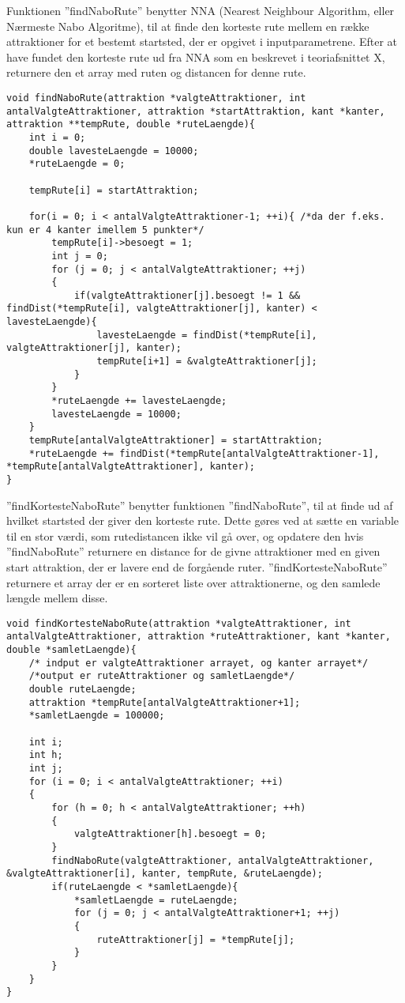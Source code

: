 Funktionen ”findNaboRute” benytter NNA (Nearest Neighbour Algorithm, eller Nærmeste Nabo Algoritme), til at finde den korteste rute mellem en række attraktioner for et bestemt startsted, der er opgivet i inputparametrene. Efter at have fundet den korteste rute ud fra NNA som en beskrevet i teoriafsnittet X, returnere den et array med ruten og distancen for denne rute. 

\begin{lstlisting}
void findNaboRute(attraktion *valgteAttraktioner, int antalValgteAttraktioner, attraktion *startAttraktion, kant *kanter, attraktion **tempRute, double *ruteLaengde){
	int i = 0;
	double lavesteLaengde = 10000;
	*ruteLaengde = 0;

	tempRute[i] = startAttraktion;

	for(i = 0; i < antalValgteAttraktioner-1; ++i){ /*da der f.eks. kun er 4 kanter imellem 5 punkter*/
		tempRute[i]->besoegt = 1;
		int j = 0;
		for (j = 0; j < antalValgteAttraktioner; ++j)
		{
			if(valgteAttraktioner[j].besoegt != 1 && findDist(*tempRute[i], valgteAttraktioner[j], kanter) < lavesteLaengde){
				lavesteLaengde = findDist(*tempRute[i], valgteAttraktioner[j], kanter);
				tempRute[i+1] = &valgteAttraktioner[j];
			}
		}
		*ruteLaengde += lavesteLaengde;
		lavesteLaengde = 10000;
	}
	tempRute[antalValgteAttraktioner] = startAttraktion;
	*ruteLaengde += findDist(*tempRute[antalValgteAttraktioner-1], *tempRute[antalValgteAttraktioner], kanter);
}
\end{lstlisting}

”findKortesteNaboRute” benytter funktionen ”findNaboRute”, til at finde ud af hvilket startsted der giver den korteste rute. Dette gøres ved at sætte en variable til en stor værdi, som rutedistancen ikke vil gå over, og opdatere den hvis ”findNaboRute” returnere en distance for de givne attraktioner med en given start attraktion, der er lavere end de forgående ruter. ”findKortesteNaboRute” returnere et array der er en sorteret liste over attraktionerne, og den samlede længde mellem disse. 

\begin{lstlisting}
void findKortesteNaboRute(attraktion *valgteAttraktioner, int antalValgteAttraktioner, attraktion *ruteAttraktioner, kant *kanter, double *samletLaengde){
	/* indput er valgteAttraktioner arrayet, og kanter arrayet*/
	/*output er ruteAttraktioner og samletLaengde*/
	double ruteLaengde;
	attraktion *tempRute[antalValgteAttraktioner+1];
	*samletLaengde = 100000;
	
	int i;
	int h;
	int j;
	for (i = 0; i < antalValgteAttraktioner; ++i)
	{
		for (h = 0; h < antalValgteAttraktioner; ++h)
		{
			valgteAttraktioner[h].besoegt = 0;
		}
		findNaboRute(valgteAttraktioner, antalValgteAttraktioner, &valgteAttraktioner[i], kanter, tempRute, &ruteLaengde);
		if(ruteLaengde < *samletLaengde){
			*samletLaengde = ruteLaengde;
			for (j = 0; j < antalValgteAttraktioner+1; ++j)
			{
				ruteAttraktioner[j] = *tempRute[j];
			}
		}
	}
}
\end{lstlisting}

